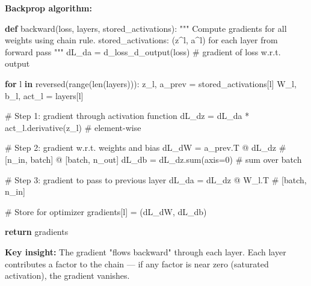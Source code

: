 \documentclass[11pt]{article}
\newenvironment{Shaded}{\begin{snugshade}}{\end{snugshade}}
\newcommand{\BuiltInTok}[1]{\textcolor[rgb]{0.50,0.55,0.55}{#1}}
\newcommand{\CommentTok}[1]{\textcolor[rgb]{0.48,0.49,0.49}{#1}}
\newcommand{\ControlFlowTok}[1]{\textcolor[rgb]{0.99,0.74,0.29}{\textbf{#1}}}
\newcommand{\DecValTok}[1]{\textcolor[rgb]{0.96,0.45,0.00}{#1}}
\newcommand{\KeywordTok}[1]{\textcolor[rgb]{0.81,0.81,0.76}{\textbf{#1}}}
\newcommand{\NormalTok}[1]{\textcolor[rgb]{0.81,0.81,0.76}{#1}}
\newcommand{\OperatorTok}[1]{\textcolor[rgb]{0.81,0.81,0.76}{#1}}
\begin{document}
\textbf{Backprop algorithm:}


\begin{Shaded}
\begin{Highlighting}[]
\KeywordTok{def}\NormalTok{ backward(loss, layers, stored\_activations):}
    \CommentTok{"""}
\CommentTok{    Compute gradients for all weights using chain rule.}
\CommentTok{    stored\_activations: (z\^{}l, a\^{}l) for each layer from forward pass}
\CommentTok{    """}
\NormalTok{    dL\_da }\OperatorTok{=}\NormalTok{ d\_loss\_d\_output(loss)           }\CommentTok{\# gradient of loss w.r.t. output}
    
    \ControlFlowTok{for}\NormalTok{ l }\KeywordTok{in} \BuiltInTok{reversed}\NormalTok{(}\BuiltInTok{range}\NormalTok{(}\BuiltInTok{len}\NormalTok{(layers))):}
\NormalTok{        z\_l, a\_prev }\OperatorTok{=}\NormalTok{ stored\_activations[l]}
\NormalTok{        W\_l, b\_l, act\_l }\OperatorTok{=}\NormalTok{ layers[l]}
        
        \CommentTok{\# Step 1: gradient through activation function}
\NormalTok{        dL\_dz }\OperatorTok{=}\NormalTok{ dL\_da }\OperatorTok{*}\NormalTok{ act\_l.derivative(z\_l)   }\CommentTok{\# element{-}wise}
        
        \CommentTok{\# Step 2: gradient w.r.t. weights and bias}
\NormalTok{        dL\_dW }\OperatorTok{=}\NormalTok{ a\_prev.T }\OperatorTok{@}\NormalTok{ dL\_dz                }\CommentTok{\# [n\_in, batch] @ [batch, n\_out]}
\NormalTok{        dL\_db }\OperatorTok{=}\NormalTok{ dL\_dz.}\BuiltInTok{sum}\NormalTok{(axis}\OperatorTok{=}\DecValTok{0}\NormalTok{)               }\CommentTok{\# sum over batch}
        
        \CommentTok{\# Step 3: gradient to pass to previous layer}
\NormalTok{        dL\_da }\OperatorTok{=}\NormalTok{ dL\_dz }\OperatorTok{@}\NormalTok{ W\_l.T                   }\CommentTok{\# [batch, n\_in]}
        
        \CommentTok{\# Store for optimizer}
\NormalTok{        gradients[l] }\OperatorTok{=}\NormalTok{ (dL\_dW, dL\_db)}
    
    \ControlFlowTok{return}\NormalTok{ gradients}
\end{Highlighting}
\end{Shaded}

\textbf{Key insight:} The gradient "flows backward" through each layer. Each layer contributes a factor to the chain --- if any factor is near zero (saturated activation), the gradient vanishes.
\end{document}

